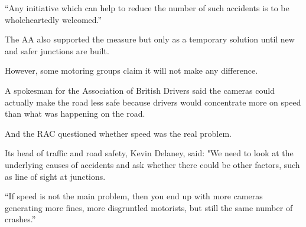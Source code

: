 \documentclass[11pt]{article}
\begin{document}
``Any initiative which can help to reduce the number of such accidents
is to be wholeheartedly welcomed.''

The AA also supported the measure but only as a temporary solution
until new and safer junctions are built.

However, some motoring groups claim it will not make any difference.

A spokesman for the Association of British Drivers said the cameras
could actually make the road less safe because drivers would
concentrate more on speed than what was happening on the road.

And the RAC questioned whether speed was the real problem.

Its head of traffic and road safety, Kevin Delaney, said: "We need to
look at the underlying causes of accidents and ask whether there could
be other factors, such as line of sight at junctions.

``If speed is not the main problem, then you end up with more cameras
generating more fines, more disgruntled motorists, but still the same
number of crashes.''

\vfill


\nocite{*}

\end{document}
